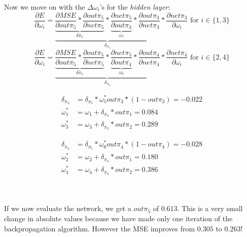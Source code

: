 Now we move on with the $\Delta\omega_i$'s for the \textit{hidden layer}:
\begin{equation*}
	\frac{\partial E}{\partial \omega_i}=\underbrace{\underbrace{\frac{\partial MSE}{\partial out\pi_5}*\frac{\partial out\pi_5}{\partial net\pi_5}}_{\delta\pi_5}*\underbrace{\frac{\partial net\pi_5}{\partial out\pi_3}}_{\omega_5}*\frac{\partial out\pi_3}{\partial net\pi_3}}_{\delta_{\pi_3}}*\frac{\partial net\pi_3}{\partial \omega_i}\text{ for }i\in\{1,3\}
\end{equation*}
\begin{equation*}
	\frac{\partial E}{\partial \omega_i}=\underbrace{\underbrace{\frac{\partial MSE}{\partial out\pi_5}*\frac{\partial out\pi_5}{\partial net\pi_5}}_{\delta\pi_5}*\underbrace{\frac{\partial net\pi_5}{\partial out\pi_4}}_{\omega_6}*\frac{\partial out\pi_4}{\partial net\pi_4}}_{\delta_{\pi_4}}*\frac{\partial net\pi_4}{\partial \omega_i}\text{ for }i\in\{2,4\}
\end{equation*}

\noindent\begin{minipage}{.5\linewidth}
	\begin{align*} 
		\delta_{\pi_3} &= \delta_{\pi_5}*\omega_5^*out\pi_3*(1-out\pi_3)=-0.022\\ 
		\omega_1^* &= \omega_1+\delta_{\pi_3}*out\pi_1=0.084 \\
		\omega_3^* &= \omega_3+\delta_{\pi_3}*out\pi_2=0.289
	\end{align*}
\end{minipage}%
\begin{minipage}{.5\linewidth}
	\begin{align*} 
		\delta_{\pi_4} &= \delta_{\pi_5}*\omega_6^*out\pi_4*(1-out\pi_4)=-0.028\\ 
		\omega_2^* &= \omega_2+\delta_{\pi_4}*out\pi_1=0.180 \\
		\omega_4^* &= \omega_4+\delta_{\pi_4}*out\pi_2=0.386
	\end{align*}
\end{minipage}\\
\\
If we now evaluate the network, we get a $out\pi_5$ of $0.613$. This is a very small change in absolute values because we have made only one iteration of the backpropagation algorithm. However the MSE improves from $0.305$ to $0.263$!

